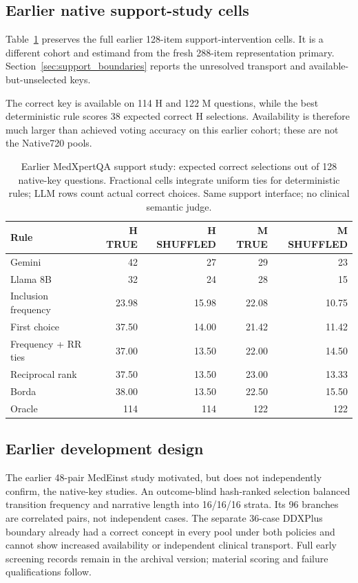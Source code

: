 \subsection{Earlier native support-study cells}\label{app:earlier_native_cells}
Table~\ref{tab:medx} preserves the full earlier 128-item support-intervention cells. It is a different cohort and estimand from the fresh 288-item representation primary. Section~\ref{sec:support_boundaries} reports the unresolved transport and available-but-unselected keys.

The correct key is available on 114 H and 122 M questions, while the best deterministic rule scores 38 expected correct H selections. Availability is therefore much larger than achieved voting accuracy on this earlier cohort; these are not the Native720 pools.

\begin{table}[htbp]
\centering\small
\caption{Earlier MedXpertQA support study: expected correct selections out of 128 native-key questions. Fractional cells integrate uniform ties for deterministic rules; LLM rows count actual correct choices. Same support interface; no clinical semantic judge.}
\label{tab:medx}
\begin{tabular}{lrrrr}
\toprule
Rule & H TRUE & H SHUFFLED & M TRUE & M SHUFFLED\\
\midrule
Gemini &42&27&29&23\\
Llama 8B &32&24&28&15\\
Inclusion frequency &23.98&15.98&22.08&10.75\\
First choice &37.50&14.00&21.42&11.42\\
Frequency + RR ties &37.00&13.50&22.00&14.50\\
Reciprocal rank &37.50&13.50&23.00&13.33\\
Borda &38.00&13.50&22.50&15.50\\
Oracle &114&114&122&122\\
\bottomrule
\end{tabular}
\end{table}

\subsection{Earlier development design}\label{app:pipeline}
The earlier 48-pair MedEinst study motivated, but does not independently confirm, the native-key studies. An outcome-blind hash-ranked selection balanced transition frequency and narrative length into 16/16/16 strata. Its 96 branches are correlated pairs, not independent cases. The separate 36-case DDXPlus boundary already had a correct concept in every pool under both policies and cannot show increased availability or independent clinical transport. Full early screening records remain in the archival version; material scoring and failure qualifications follow.

